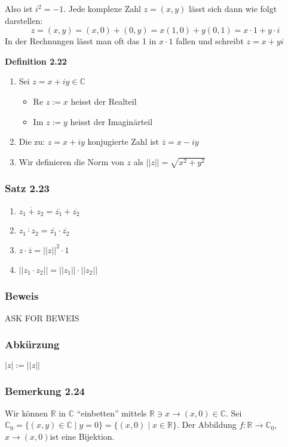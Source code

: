 Also ist $i^2=-1$. Jede komplexe Zahl $z=(x,y)$ lässt sich dann wie folgt darstellen:  $$z=(x,y)=(x,0)+(0,y)=x(1,0)+y(0,1)=x\cdot 1+ y\cdot i$$
In der Rechnungen lässt man oft das 1 in $x\cdot 1$ fallen und schreibt $z=x+yi$
\begin{framed}
\centerline{\textbf{Definition 2.22}}
\begin{enumerate}
\item Sei $z=x+iy\in\mathbb{C}$
\begin{itemize}
\item Re $z:=x$ heisst der Realteil
\item Im $z:=y$ heisst der Imaginärteil 
\end{itemize}
\item Die zu: $z=x+iy$ konjugierte Zahl ist $\overline{z}=x-iy$
\item Wir definieren die Norm von $z$ als $\left|\left| z\right|\right|=\sqrt{x^2+y^2}$
\end{enumerate}
\end{framed}
\subsubsection*{Satz 2.23}
\begin{enumerate}[\indent (i)]
\item $\overline{z_1+z_2}=\overline{z_1}+\overline{z_2}$
\item $\overline{z_1\cdot z_2}=\overline{z_1}\cdot\overline{z_2}$
\item $z\cdot\overline{z}={\left|\left| z\right|\right|}^2\cdot 1$
\item ${\left|\left| z_1\cdot z_2\right|\right|}={\left|\left| z_1\right|\right|}\cdot{\left|\left| z_2\right|\right|}$
\end{enumerate}
\subsubsection*{Beweis}
ASK FOR BEWEIS 
\subsubsection*{Abkürzung}
$\left| z\right| := \left|\left| z \right|\right|$
\subsubsection*{Bemerkung 2.24}
Wir können $\mathbb{R}$ in $\mathbb{C}$ ``einbetten'' mittels $\mathbb{R}\ni x\rightarrow (x,0)\in\mathbb{C}$. Sei $\mathbb{C}_0=\{ (x,y)\in\mathbb{C}\mid y=0 \}=\{ (x,0)\mid x\in\mathbb{R}\}$. Der Abbildung $f:\mathbb{R}\rightarrow\mathbb{C}_0$, $x\rightarrow (x,0)$ist eine Bijektion.\\

